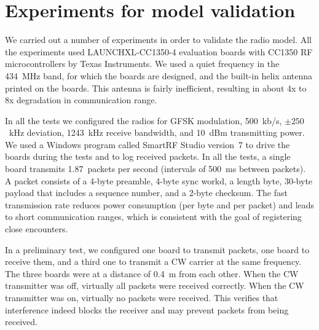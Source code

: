 \section{Experiments for model validation}
\label{experiments}

We carried out a number of experiments in order to validate the radio model. 
All the experiments used LAUNCHXL-CC1350-4 evaluation boards with CC1350 RF microcontrollers by Texas Instruments.
We used a quiet frequency in the 434~MHz band, for which the boards are
designed, and the built-in helix antenna printed on the boards.
This antenna is fairly inefficient, resulting in about 4x to 8x degradation in communication range. 

In all the tests we configured the radios for GFSK modulation, 500~kb/s, $\pm 250$~kHz deviation, 1243~kHz receive bandwidth,
and 10~dBm transmitting power. We used a Windows program called SmartRF Studio version~7 to drive the boards during
the tests and to log received packets. In all the tests,
a single board transmits 1.87~packets per second (intervals of
500~ms between packets). A packet consists of a 4-byte preamble, 4-byte sync workd, a length byte, 30-byte payload 
that includes a sequence number, and a 2-byte checksum. The fast transmission rate reduces power consumption (per byte and
per packet) and leads to short communication ranges, which is consistent with the goal of registering close encounters.

In a preliminary test, we configured one board to transmit packets, one
board to receive them, and a third one to transmit a
CW carrier at the same frequency. The three boards were at a distance of 0.4~m from each other. When the CW transmitter
was off, virtually all packets were received correctly. When the CW transmitter was on, virtually no packets were received.
This verifies that interference indeed blocks the receiver and may prevent packets from being received.


